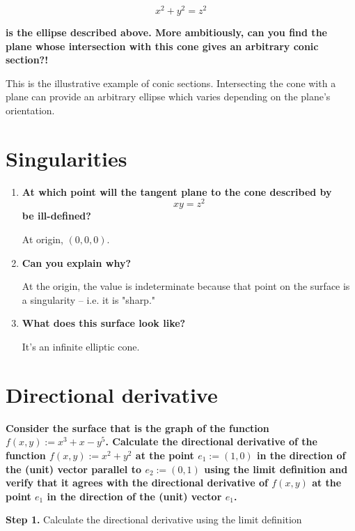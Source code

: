 \documentclass{article}
\begin{document}
    \[x^2+y^2=z^2\]
    
    \textbf{is the ellipse described above. More ambitiously, can you find the plane whose intersection with this cone gives an arbitrary conic section?!}
    
    This is the illustrative example of conic sections. Intersecting the cone with a plane can provide an arbitrary ellipse which varies depending on the plane's orientation.
    
\section{Singularities}
\begin{enumerate}
    \item\textbf{At which point will the tangent plane to the cone described by}
    \[xy = z^2\]
    \textbf{be ill-defined?}
    
    At origin, $(0,0,0)$.
    
    \item\textbf{Can you explain why?}
    
    At the origin, the value is indeterminate because that point on the surface is a singularity -- i.e. it is "sharp."
    
    \item\textbf{What does this surface look like?}
    
    It's an infinite elliptic cone.
\end{enumerate}

\section{Directional derivative}
\textbf{Consider the surface that is the graph of the function $f(x,y):=x^3+x-y^5$. Calculate the directional derivative of the function $f(x, y) := x^2+y^2$ at the point $e_1 := (1,0)$ in the direction of the (unit) vector parallel to $e_2 := (0,1)$ using the limit definition and verify that it agrees with the directional derivative of $f(x, y)$ at the point $e_1$ in the direction of the (unit) vector $e_1$.}

\textbf{Step 1.} Calculate the directional derivative using the limit definition
\end{document}
